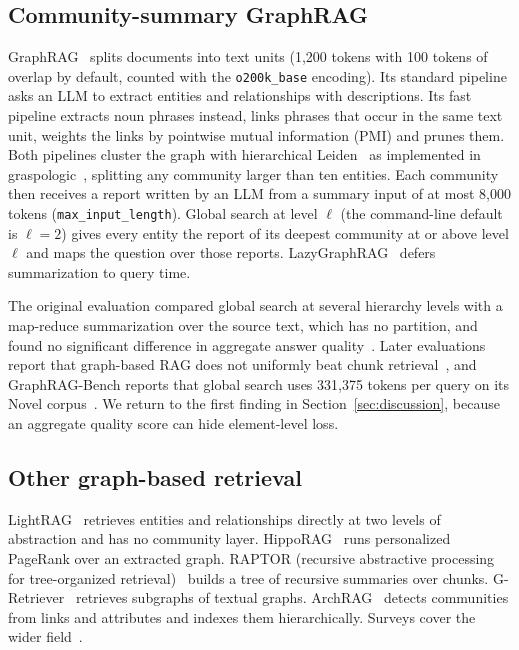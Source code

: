 \documentclass{ieeeaccess}
\theoremstyle{remark}
\begin{document}
\subsection{Community-summary GraphRAG}
GraphRAG~\cite{edge2024graphrag,graphrag311} splits documents into text units (1,200 tokens with 100 tokens of overlap by default, counted with the \texttt{o200k\_base} encoding). Its standard pipeline asks an LLM to extract entities and relationships with descriptions. Its fast pipeline extracts noun phrases instead, links phrases that occur in the same text unit, weights the links by pointwise mutual information (PMI) and prunes them. Both pipelines cluster the graph with hierarchical Leiden~\cite{traag2019leiden} as implemented in graspologic~\cite{chung2019graspy}, splitting any community larger than ten entities. Each community then receives a report written by an LLM from a summary input of at most 8,000 tokens (\texttt{max\_input\_length}). Global search at level $\ell$ (the command-line default is $\ell=2$) gives every entity the report of its deepest community at or above level $\ell$ and maps the question over those reports. LazyGraphRAG~\cite{edge2024lazygraphrag} defers summarization to query time.

The original evaluation compared global search at several hierarchy levels with a map-reduce summarization over the source text, which has no partition, and found no significant difference in aggregate answer quality~\cite{edge2024graphrag}. Later evaluations report that graph-based RAG does not uniformly beat chunk retrieval~\cite{han2025ragvsgraphrag,xiang2026graphragbench,zhou2025indepth}, and GraphRAG-Bench reports that global search uses 331,375 tokens per query on its Novel corpus~\cite{xiang2026graphragbench}. We return to the first finding in Section~\ref{sec:discussion}, because an aggregate quality score can hide element-level loss.

\subsection{Other graph-based retrieval}
LightRAG~\cite{guo2024lightrag} retrieves entities and relationships directly at two levels of abstraction and has no community layer. HippoRAG~\cite{gutierrez2024hipporag} runs personalized PageRank over an extracted graph. RAPTOR (recursive abstractive processing for tree-organized retrieval)~\cite{sarthi2024raptor} builds a tree of recursive summaries over chunks. G-Retriever~\cite{he2024gretriever} retrieves subgraphs of textual graphs. ArchRAG~\cite{wang2026archrag} detects communities from links and attributes and indexes them hierarchically. Surveys cover the wider field~\cite{peng2024graphragsurvey}.
\end{document}
